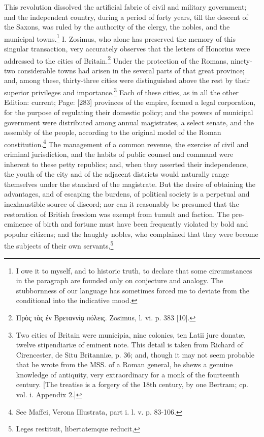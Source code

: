 This revolution dissolved the artificial fabric of civil and military government; and the independent country, during a period of forty years, till the descent of the Saxons, was ruled by the authority of the clergy, the nobles, and the municipal towns.\footnote{I owe it to myself, and to historic truth, to declare that some circumstances in the paragraph are founded only on conjecture and analogy. The stubbornness of our language has sometimes forced me to deviate from the conditional into the indicative mood.} I. Zosimus, who alone has preserved the memory of this singular transaction, very accurately observes that the letters of Honorius were addressed to the cities of Britain.\footnote{\textgreek{Πρ\texthebrew{ὸ}ς τ\texthebrew{ὰ}ς \texthebrew{ἐ}ν Βρεταννί\texthebrew{ᾳ} πόλεις}. Zosimus, l. vi. p. 383 [10].} Under the protection of the Romans, ninety-two considerable towns had arisen in the several parts of that great province; and, among these, thirty-three cities were distinguished above the rest by their superior privileges and importance.\footnote{Two cities of Britain were municipia, nine colonies, ten Latii jure donatæ, twelve stipendiariæ of eminent note. This detail is taken from Richard of Cirencester, de Situ Britanniæ, p. 36; and, though it may not seem probable that he wrote from the MSS. of a Roman general, he shews a genuine knowledge of antiquity, very extraordinary for a monk of the fourteenth century. [The treatise is a forgery of the 18th century, by one Bertram; cp. vol. i. Appendix 2.]} Each of these cities, as in all the other Edition: current; Page: [283] provinces of the empire, formed a legal corporation, for the purpose of regulating their domestic policy; and the powers of municipal government were distributed among annual magistrates, a select senate, and the assembly of the people, according to the original model of the Roman constitution.\footnote{See Maffei, Verona Illustrata, part i. l. v. p. 83-106.} The management of a common revenue, the exercise of civil and criminal jurisdiction, and the habits of public counsel and command were inherent to these petty republics; and, when they asserted their independence, the youth of the city and of the adjacent districts would naturally range themselves under the standard of the magistrate. But the desire of obtaining the advantages, and of escaping the burdens, of political society is a perpetual and inexhaustible source of discord; nor can it reasonably be presumed that the restoration of British freedom was exempt from tumult and faction. The pre-eminence of birth and fortune must have been frequently violated by bold and popular citizens; and the haughty nobles, who complained that they were become the subjects of their own servants,\footnote{Leges restituit, libertatemque reducit,

}
